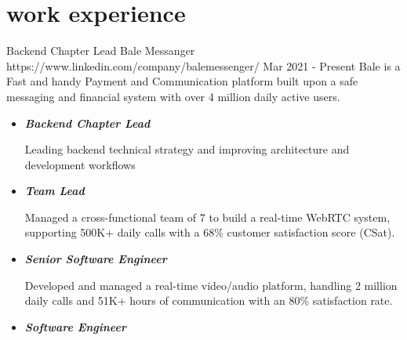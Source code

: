 \documentclass[a4paper]{article}
\begin{document}
\begin{minipage}[t]{0.65\textwidth}
  \section{work experience}
  {
    \expheadingwithlink
      {Backend Chapter Lead}
      {Bale Messanger}
      {https://www.linkedin.com/company/balemessenger/}
      {Mar 2021 - Present}
      {Bale is a Fast and handy Payment and Communication platform built upon a safe messaging and financial system with over 4 million daily active users.}
    \begin{itemize}[leftmargin=.5cm, itemsep=1pt]
        \item 
            \begin{small}
                \textbf{\emph{Backend Chapter Lead}} \newline
                \begin{justifying}\small 
                    Leading backend technical strategy and improving architecture and development workflows
                \end{justifying}
            \end{small}
        \item
            \begin{small}
                \textbf{\emph{Team Lead}} \newline
                \begin{justifying}\small 
                    Managed a cross-functional team of 7 to build a real-time WebRTC system, supporting 500K+ daily calls with a 68\% customer satisfaction score (CSat).
                \end{justifying}
            \end{small}
        \item
            \begin{small}
                \textbf{\emph{Senior Software Engineer}} \newline
                \begin{justifying}\small 
                    Developed and managed a real-time video/audio platform, handling 2 million daily calls and 51K+ hours of communication with an 80\% satisfaction rate.
                \end{justifying}
            \end{small}
        \item
            \begin{small}
                \textbf{\emph{Software Engineer}} \newline


\end{small}
\end{itemize}}
\end{minipage}
\end{document}
